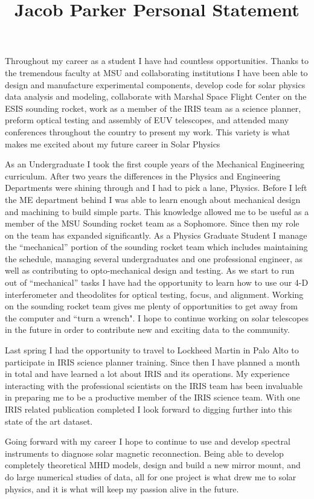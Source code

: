 \documentclass[10pt,letterpaper]{article}
\begin{document}
	\title{Jacob Parker Personal Statement}
	\date{}
	\maketitle
	
	Throughout my career as a student I have had countless opportunities. Thanks to the tremendous faculty at MSU and collaborating institutions I have been able to design and manufacture experimental components, develop code for solar physics data analysis and modeling, collaborate with Marshal Space Flight Center on the ESIS sounding rocket, work as a member of the IRIS team as a science planner, preform optical testing and assembly of EUV telescopes, and attended many conferences throughout the country to present my work.  This variety is what makes me excited about my future career in Solar Physics
	
	As an Undergraduate I took the first couple years of the Mechanical Engineering curriculum.  After two years the differences in the Physics and Engineering Departments were shining through and I had to pick a lane, Physics.  Before I left the ME department behind I was able to learn enough about mechanical design and machining to build simple parts.  This knowledge allowed me to be useful as a member of the MSU Sounding rocket team as a Sophomore.  Since then my role on the team has expanded significantly.  As a Physics Graduate Student I manage the ``mechanical'' portion of the sounding rocket team which includes maintaining the schedule, managing several undergraduates and one professional engineer, as well as contributing to opto-mechanical design and testing.  As we start to run out of ``mechanical'' tasks I have had the opportunity to learn how to use our 4-D interferometer and theodolites for optical testing, focus, and alignment.  Working on the sounding rocket team gives me plenty of opportunities to get away from the computer and ``turn a wrench". I hope to continue working on solar telescopes in the future in order to contribute new and exciting data to the community.
	
	Last spring I had the opportunity to travel to Lockheed Martin in Palo Alto to participate in IRIS science planner training.  Since then I have planned a month in total and have learned a lot about IRIS and its operations.  My experience interacting with the professional scientists on the IRIS team has been invaluable in preparing me to be a productive member of the IRIS science team.  With one IRIS related publication completed I look forward to digging further into this state of the art dataset.
	
	Going forward with my career I hope to continue to use and develop spectral instruments to diagnose solar magnetic reconnection.  Being able to develop completely theoretical MHD models, design and build a new mirror mount, and do large numerical studies of data, all for one project is what drew me to solar physics, and it is what will keep my passion alive in the future.
	
	
\end{document}
